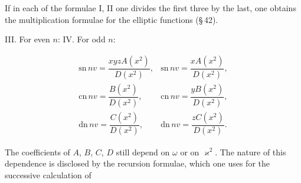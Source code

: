If in each of the formulae I, II one divides the first three by the last,
one obtains the multiplication formulae for the elliptic
functions (\S\,42).

\begin{center}
III. For even $n$: \qquad\qquad IV. For odd $n$:
\end{center}
\[
\begin{array}{ll}
\mathrm{sn}\,nv = \dfrac{xyzA(x^2)}{D(x^2)}, & \mathrm{sn}\,nv = \dfrac{xA(x^2)}{D(x^2)}, \\[10pt]
\mathrm{cn}\,nv = \dfrac{B(x^2)}{D(x^2)}, & \mathrm{cn}\,nv = \dfrac{yB(x^2)}{D(x^2)}, \\[10pt]
\mathrm{dn}\,nv = \dfrac{C(x^2)}{D(x^2)}, & \mathrm{dn}\,nv = \dfrac{zC(x^2)}{D(x^2)}.
\end{array}
\]

The coefficients of $A$, $B$, $C$, $D$ still depend on $\omega$ or on
$\varkappa^2$. The nature of this dependence is disclosed by the recursion formulae,
which one uses for the successive calculation of
